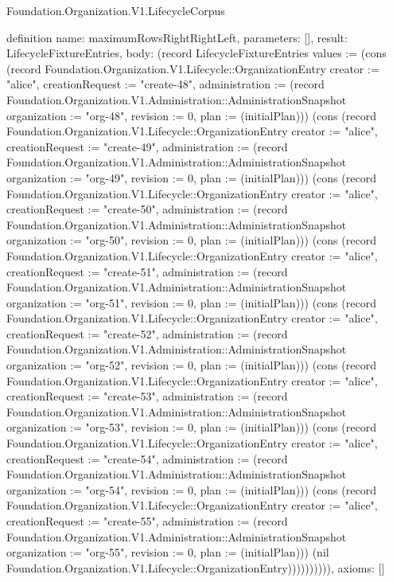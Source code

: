\begin{lexlean}{Foundation.Organization.V1.LifecycleCorpus}
\begin{semanticmodule}
definition{
  name: maximumRowsRightRightLeft,
  parameters: [],
  result: LifecycleFixtureEntries,
  body: (record LifecycleFixtureEntries {values := (cons (record Foundation.Organization.V1.Lifecycle::OrganizationEntry {creator := "alice", creationRequest := "create-48", administration := (record Foundation.Organization.V1.Administration::AdministrationSnapshot {organization := "org-48", revision := 0, plan := (initialPlan)})}) (cons (record Foundation.Organization.V1.Lifecycle::OrganizationEntry {creator := "alice", creationRequest := "create-49", administration := (record Foundation.Organization.V1.Administration::AdministrationSnapshot {organization := "org-49", revision := 0, plan := (initialPlan)})}) (cons (record Foundation.Organization.V1.Lifecycle::OrganizationEntry {creator := "alice", creationRequest := "create-50", administration := (record Foundation.Organization.V1.Administration::AdministrationSnapshot {organization := "org-50", revision := 0, plan := (initialPlan)})}) (cons (record Foundation.Organization.V1.Lifecycle::OrganizationEntry {creator := "alice", creationRequest := "create-51", administration := (record Foundation.Organization.V1.Administration::AdministrationSnapshot {organization := "org-51", revision := 0, plan := (initialPlan)})}) (cons (record Foundation.Organization.V1.Lifecycle::OrganizationEntry {creator := "alice", creationRequest := "create-52", administration := (record Foundation.Organization.V1.Administration::AdministrationSnapshot {organization := "org-52", revision := 0, plan := (initialPlan)})}) (cons (record Foundation.Organization.V1.Lifecycle::OrganizationEntry {creator := "alice", creationRequest := "create-53", administration := (record Foundation.Organization.V1.Administration::AdministrationSnapshot {organization := "org-53", revision := 0, plan := (initialPlan)})}) (cons (record Foundation.Organization.V1.Lifecycle::OrganizationEntry {creator := "alice", creationRequest := "create-54", administration := (record Foundation.Organization.V1.Administration::AdministrationSnapshot {organization := "org-54", revision := 0, plan := (initialPlan)})}) (cons (record Foundation.Organization.V1.Lifecycle::OrganizationEntry {creator := "alice", creationRequest := "create-55", administration := (record Foundation.Organization.V1.Administration::AdministrationSnapshot {organization := "org-55", revision := 0, plan := (initialPlan)})}) (nil Foundation.Organization.V1.Lifecycle::OrganizationEntry)))))))))}),
  axioms: []
}


\end{semanticmodule}
\end{lexlean}

